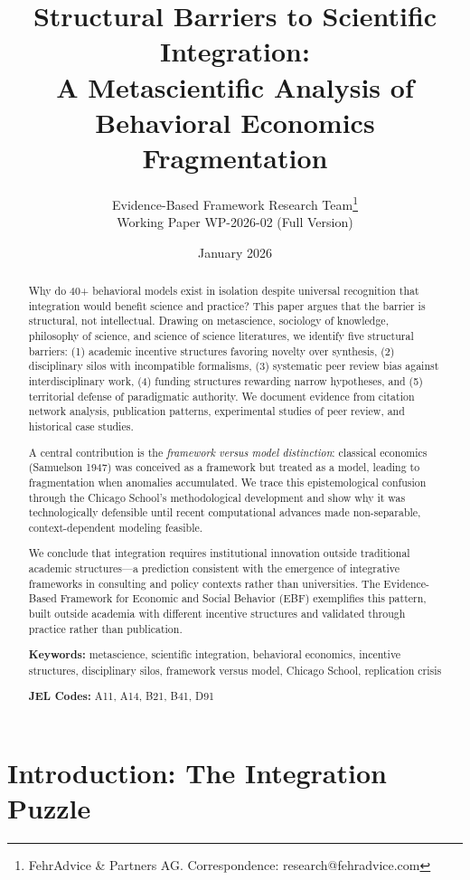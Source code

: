 \documentclass[12pt,a4paper]{article}
\title{\textbf{Structural Barriers to Scientific Integration:\\A Metascientific Analysis of Behavioral Economics Fragmentation}}
\author{Evidence-Based Framework Research Team\thanks{FehrAdvice \& Partners AG. Correspondence: research@fehradvice.com}\\[0.5em]\small Working Paper WP-2026-02 (Full Version)}
\date{January 2026}
\begin{document}
\maketitle

\begin{abstract}
Why do 40+ behavioral models exist in isolation despite universal recognition that integration would benefit science and practice? This paper argues that the barrier is structural, not intellectual. Drawing on metascience, sociology of knowledge, philosophy of science, and science of science literatures, we identify five structural barriers: (1) academic incentive structures favoring novelty over synthesis, (2) disciplinary silos with incompatible formalisms, (3) systematic peer review bias against interdisciplinary work, (4) funding structures rewarding narrow hypotheses, and (5) territorial defense of paradigmatic authority. We document evidence from citation network analysis, publication patterns, experimental studies of peer review, and historical case studies.

A central contribution is the \textit{framework versus model distinction}: classical economics (Samuelson 1947) was conceived as a framework but treated as a model, leading to fragmentation when anomalies accumulated. We trace this epistemological confusion through the Chicago School's methodological development and show why it was technologically defensible until recent computational advances made non-separable, context-dependent modeling feasible.

We conclude that integration requires institutional innovation outside traditional academic structures---a prediction consistent with the emergence of integrative frameworks in consulting and policy contexts rather than universities. The Evidence-Based Framework for Economic and Social Behavior (EBF) exemplifies this pattern, built outside academia with different incentive structures and validated through practice rather than publication.

\medskip
\textbf{Keywords:} metascience, scientific integration, behavioral economics, incentive structures, disciplinary silos, framework versus model, Chicago School, replication crisis

\medskip
\textbf{JEL Codes:} A11, A14, B21, B41, D91
\end{abstract}

\newpage
\tableofcontents
\newpage

\section{Introduction: The Integration Puzzle}
\label{sec:intro}
\end{document}

